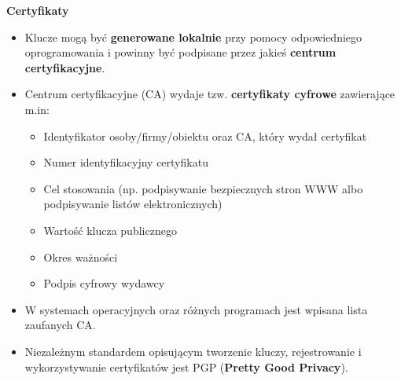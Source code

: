 \documentclass[main.tex]{subfiles}
\begin{document}
    \noindent \textbf{Certyfikaty}
    \begin{itemize}[noitemsep]
        \item Klucze mogą być \textbf{generowane lokalnie} przy pomocy odpowiedniego oprogramowania i powinny
        być podpisane przez jakieś \textbf{centrum certyfikacyjne}.
        \item Centrum certyfikacyjne (CA) wydaje tzw. \textbf{certyfikaty cyfrowe} zawierające m.in:
        \begin{itemize}[noitemsep]
            \item Identyfikator osoby/firmy/obiektu oraz CA, który wydał certyfikat
            \item Numer identyfikacyjny certyfikatu
            \item Cel stosowania (np. podpisywanie bezpiecznych stron WWW albo podpisywanie listów elektronicznych)
            \item Wartość klucza publicznego
            \item Okres ważności
            \item Podpis cyfrowy wydawcy
        \end{itemize}
        \item W systemach operacyjnych oraz różnych programach jest wpisana lista zaufanych CA.
        \item Niezależnym standardem opisującym tworzenie kluczy, rejestrowanie i wykorzystywanie
        certyfikatów jest PGP (\textbf{Pretty Good Privacy}).
    \end{itemize}
\end{document}
